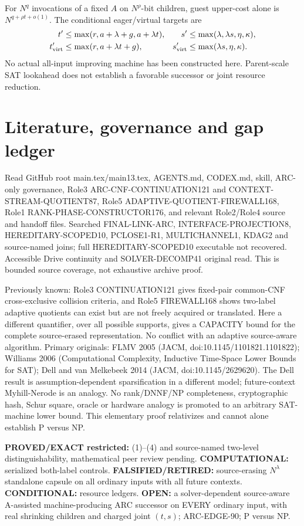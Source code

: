 \documentclass[11pt]{article}
\begin{document}
For $N^q$ invocations of a fixed $A$ on
$N^\rho$-bit children, guest upper-cost
alone is $N^{q+\rho t+o(1)}$.
The conditional eager/virtual targets are
\[
\begin{split}
t'&\le\max(r,a+\lambda+g,a+\lambda t),&
s'&\le\max(\lambda,\lambda s,\eta,\kappa),\\
t'_{\rm virt}&\le\max(r,a+\lambda t+g),&
s'_{\rm virt}&\le\max(\lambda s,\eta,\kappa).
\end{split}
\]
No actual all-input improving machine
has been constructed here. Parent-scale SAT
lookahead does not establish a favorable
successor or joint resource reduction.

\section{Literature, governance and gap ledger}
Read GitHub root main.tex/main13.tex,
AGENTS.md, CODEX.md, skill, ARC-only governance,
Role3 ARC-CNF-CONTINUATION121 and
CONTEXT-STREAM-QUOTIENT87, Role5
ADAPTIVE-QUOTIENT-FIREWALL168, Role1
RANK-PHASE-CONSTRUCTOR176, and relevant
Role2/Role4 source and handoff files. Searched
FINAL-LINK-ARC, INTERFACE-PROJECTION8,
HEREDITARY-SCOPED10, PCLOSE1-R1,
MULTICHANNEL1, KDAG2 and source-named joins;
full HEREDITARY-SCOPED10 executable not
recovered. Accessible Drive continuity and
SOLVER-DECOMP41 original read. This is bounded
source coverage, not exhaustive archive proof.

Previously known: Role3 CONTINUATION121 gives
fixed-pair common-CNF cross-exclusive
collision criteria, and Role5 FIREWALL168
shows two-label adaptive quotients can exist
but are not freely acquired or translated.
Here a different quantifier, over all
possible supports, gives a CAPACITY bound
for the complete source-erased representation.
No conflict with an adaptive source-aware
algorithm. Primary originals: FLMV 2005
(JACM, doi:10.1145/1101821.1101822);
Williams 2006 (Computational Complexity,
Inductive Time-Space Lower Bounds for SAT);
Dell and van Melkebeek 2014
(JACM, doi:10.1145/2629620).
The Dell result is assumption-dependent
sparsification in a different model;
future-context Myhill-Nerode is an analogy.
No rank/DNNF/NP completeness, cryptographic
hash, Schur square, oracle or hardware analogy
is promoted to an arbitrary SAT-machine
lower bound. This elementary proof relativizes
and cannot alone establish P versus NP.

\textbf{PROVED/EXACT restricted:} (1)--(4)
and source-named two-level distinguishability,
mathematical peer review pending.
\textbf{COMPUTATIONAL:} serialized both-label
controls.
\textbf{FALSIFIED/RETIRED:} source-erasing
$N^\lambda$ standalone capsule on all
ordinary inputs with all future contexts.
\textbf{CONDITIONAL:} resource ledgers.
\textbf{OPEN:} a solver-dependent source-aware
A-assisted machine-producing ARC successor
on EVERY ordinary input, with real shrinking
children and charged joint $(t,s)$;
ARC-EDGE-90; P versus NP.
\end{document}
